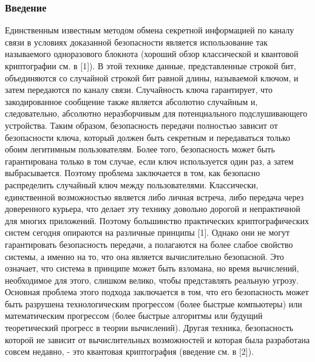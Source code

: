 \subsubsection{Введение}
Единственным известным методом обмена секретной информацией по каналу связи в условиях доказанной безопасности является использование так называемого одноразового блокнота (хороший обзор классической и квантовой криптографии см. в [1]). В этой технике данные, представленные строкой бит, объединяются со случайной строкой бит равной длины, называемой ключом, и затем передаются по каналу связи. Случайность ключа гарантирует, что закодированное сообщение также является абсолютно случайным и, следовательно, абсолютно неразборчивым для потенциального подслушивающего устройства. Таким образом, безопасность передачи полностью зависит от безопасности ключа, который должен быть секретным и передаваться только обоим легитимным пользователям. Более того, безопасность может быть гарантирована только в том случае, если ключ используется один раз, а затем выбрасывается. Поэтому проблема заключается в том, как безопасно распределить случайный ключ между пользователями. Классически, единственной возможностью является либо личная встреча, либо передача через доверенного курьера, что делает эту технику довольно дорогой и непрактичной для многих приложений. Поэтому большинство практических криптографических систем сегодня опираются на различные принципы [1]. Однако они не могут гарантировать безопасность передачи, а полагаются на более слабое свойство системы, а именно на то, что она является вычислительно безопасной. Это означает, что система в принципе может быть взломана, но время вычислений, необходимое для этого, слишком велико, чтобы представлять реальную угрозу. Основная проблема этого подхода заключается в том, что его безопасность может быть разрушена технологическим прогрессом (более быстрые компьютеры) или математическим прогрессом (более быстрые алгоритмы или будущий теоретический прогресс в теории вычислений). Другая техника, безопасность которой не зависит от вычислительных возможностей и которая была разработана совсем недавно, - это квантовая криптография (введение см. в [2]).

